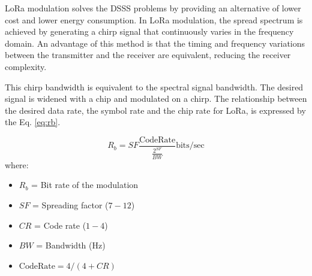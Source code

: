 

LoRa modulation solves the DSSS problems by providing an alternative of lower cost and lower energy consumption. In LoRa modulation, the spread spectrum is achieved by generating a chirp signal that continuously varies in the frequency domain. An advantage of this method is that the timing and frequency variations between the transmitter and the receiver are equivalent, reducing the receiver complexity.


This chirp bandwidth is equivalent to the spectral signal bandwidth. The desired signal is widened with a chip and modulated on a chirp. The relationship between the desired data rate, the symbol rate and the chip rate for LoRa, is expressed by the Eq. \eqref{eq:rb}.

\begin{equation} \label{eq:rb}
R_b = SF  \frac{\text{CodeRate}}{\frac{2^{SF}}{BW}} \text{bits}/\text{sec}
\end{equation}
\noindent where: 

\begin{itemize}
\item $R_b$ = Bit rate of the modulation
\item $SF$ = Spreading factor ($7-12$)
\item $CR$ = Code rate ($1-4$)
\item $BW$ = Bandwidth (Hz)
\item $\text{CodeRate} = {4}/{(4 + CR)}$
\end{itemize}

